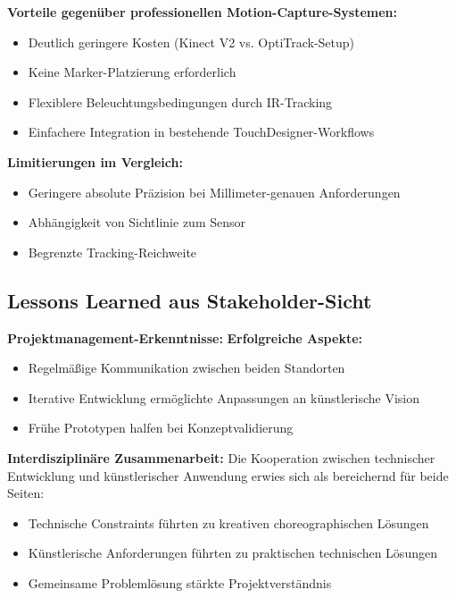 \textbf{Vorteile gegenüber professionellen Motion-Capture-Systemen:}
\begin{itemize}
    \item Deutlich geringere Kosten (Kinect V2 vs. OptiTrack-Setup)
    \item Keine Marker-Platzierung erforderlich
    \item Flexiblere Beleuchtungsbedingungen durch IR-Tracking
    \item Einfachere Integration in bestehende TouchDesigner-Workflows
\end{itemize}

\textbf{Limitierungen im Vergleich:}
\begin{itemize}
    \item Geringere absolute Präzision bei Millimeter-genauen Anforderungen
    \item Abhängigkeit von Sichtlinie zum Sensor
    \item Begrenzte Tracking-Reichweite
\end{itemize}

\subsection{Lessons Learned aus Stakeholder-Sicht}

\textbf{Projektmanagement-Erkenntnisse:}
\textbf{Erfolgreiche Aspekte:}
\begin{itemize}
    \item Regelmäßige Kommunikation zwischen beiden Standorten
    \item Iterative Entwicklung ermöglichte Anpassungen an künstlerische Vision
    \item Frühe Prototypen halfen bei Konzeptvalidierung
\end{itemize}

\textbf{Interdisziplinäre Zusammenarbeit:}
Die Kooperation zwischen technischer Entwicklung und künstlerischer Anwendung erwies sich als bereichernd für beide Seiten:

\begin{itemize}
    \item Technische Constraints führten zu kreativen choreographischen Lösungen
    \item Künstlerische Anforderungen führten zu praktischen technischen Lösungen
    \item Gemeinsame Problemlösung stärkte Projektverständnis
\end{itemize}

